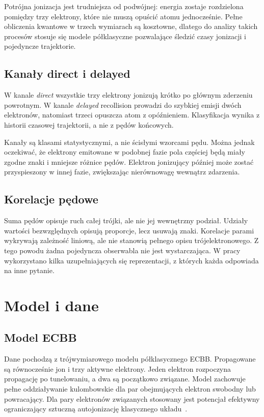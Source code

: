 \documentclass[12pt,letterpaper,oneside]{report}
\numberwithin{equation}{chapter}
\numberwithin{figure}{chapter}
\numberwithin{table}{chapter}
\newcommand{\direct}{\textit{direct}}
\newcommand{\delayed}{\textit{delayed}}
\begin{document}
Potrójna jonizacja jest trudniejsza od podwójnej: energia zostaje rozdzielona pomiędzy trzy elektrony, które nie muszą opuścić atomu jednocześnie. Pełne obliczenia kwantowe w trzech wymiarach są kosztowne, dlatego do analizy takich procesów stosuje się modele półklasyczne pozwalające śledzić czasy jonizacji i pojedyncze trajektorie.

\section{Kanały direct i delayed}

W kanale \direct{} wszystkie trzy elektrony jonizują krótko po głównym zderzeniu powrotnym. W kanale \delayed{} recollision prowadzi do szybkiej emisji dwóch elektronów, natomiast trzeci opuszcza atom z opóźnieniem. Klasyfikacja wynika z historii czasowej trajektorii, a nie z pędów końcowych.

Kanały są klasami statystycznymi, a nie ścisłymi wzorcami pędu. Można jednak oczekiwać, że elektrony emitowane w podobnej fazie pola częściej będą miały zgodne znaki i mniejsze różnice pędów. Elektron jonizujący później może zostać przyspieszony w innej fazie, zwiększając nierównowagę wewnątrz zdarzenia.

\section{Korelacje pędowe}

Suma pędów opisuje ruch całej trójki, ale nie jej wewnętrzny podział. Udziały wartości bezwzględnych opisują proporcje, lecz usuwają znaki. Korelacje parami wykrywają zależność liniową, ale nie stanowią pełnego opisu trójelektronowego. Z tego powodu żadna pojedyncza obserwabla nie jest wystarczająca. W pracy wykorzystano kilka uzupełniających się reprezentacji, z których każda odpowiada na inne pytanie.


\chapter{Model i dane}

\section{Model ECBB}

Dane pochodzą z trójwymiarowego modelu półklasycznego ECBB. Propagowane są równocześnie jon i trzy aktywne elektrony. Jeden elektron rozpoczyna propagację po tunelowaniu, a dwa są początkowo związane. Model zachowuje pełne oddziaływanie kulombowskie dla par obejmujących elektron swobodny lub powracający. Dla pary elektronów związanych stosowany jest potencjał efektywny ograniczający sztuczną autojonizację klasycznego układu~\cite{Emmanouilidou2023}.
\end{document}
